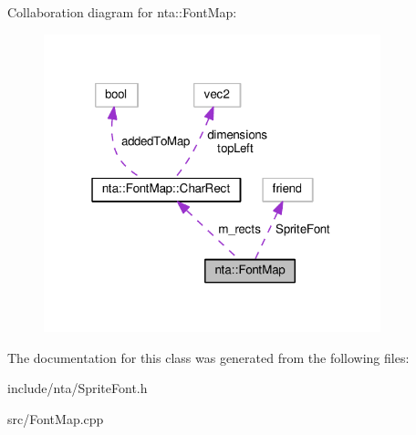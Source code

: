 Collaboration diagram for nta\+:\+:Font\+Map\+:
\nopagebreak
\begin{figure}[H]
\begin{center}
\leavevmode
\includegraphics[width=277pt]{d3/d2b/classnta_1_1FontMap__coll__graph}
\end{center}
\end{figure}


The documentation for this class was generated from the following files\+:\begin{DoxyCompactItemize}
\item 
include/nta/Sprite\+Font.\+h\item 
src/Font\+Map.\+cpp\end{DoxyCompactItemize}
